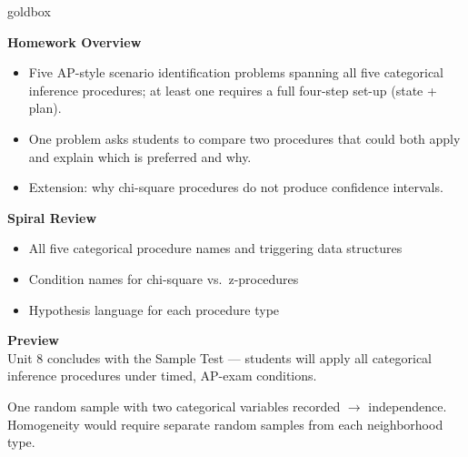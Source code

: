\documentclass[10pt]{article}
\begin{document}
\begin{skillbox}{goldbox}
\begin{minipage}[t]{0.48\linewidth}
    \textbf{Homework Overview}
    \begin{itemize}
        \item Five AP-style scenario identification problems spanning all five categorical
              inference procedures; at least one requires a full four-step set-up (state + plan).
        \item One problem asks students to compare two procedures that could both apply and
              explain which is preferred and why.
        \item Extension: why chi-square procedures do not produce confidence intervals.
    \end{itemize}
\end{minipage}
\hfill
\begin{minipage}[t]{0.48\linewidth}
    \textbf{Spiral Review}
    \begin{itemize}
        \item All five categorical procedure names and triggering data structures
        \item Condition names for chi-square vs.\ z-procedures
        \item Hypothesis language for each procedure type
    \end{itemize}
    \textbf{Preview}\\
    Unit 8 concludes with the Sample Test --- students will apply all categorical inference
    procedures under timed, AP-exam conditions.
\end{minipage}
\end{skillbox}


\begin{teachernote}[Homework]
One random sample with two categorical variables recorded $\to$ independence. Homogeneity would require separate random samples from each neighborhood type.
\end{teachernote}
\end{document}
